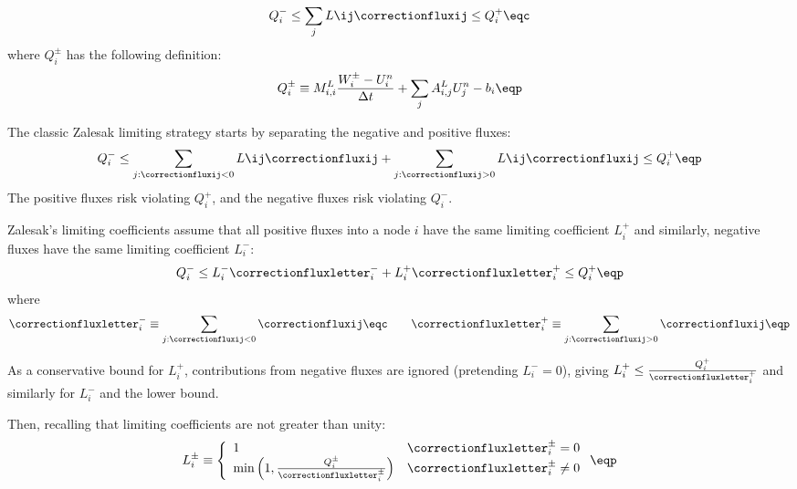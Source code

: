       \begin{equation}
         Q^-_i \leq \sum\limits_j L\ij \correctionfluxij \leq Q^+_i \eqc
      \end{equation}
      where $Q_i^\pm$ has the following definition:
      \begin{equation}
         Q_i^\pm \equiv M_{i,i}^L\frac{W_i^\pm-U_i^n}{\Delta t}
         + \sum\limits_j A_{i,j}^L U_j^n - b_i \eqp
      \end{equation}
   \item The classic Zalesak limiting strategy starts by separating the
      negative and positive fluxes:
      \begin{equation}
         Q^-_i \leq \sum\limits_{j:\correctionfluxij<0} L\ij \correctionfluxij +
            \sum\limits_{j:\correctionfluxij>0} L\ij \correctionfluxij\leq Q^+_i \eqp
      \end{equation}
      The positive fluxes risk violating $Q_i^+$, and the negative fluxes risk
      violating $Q_i^-$.
   \item Zalesak's limiting coefficients assume that
      all positive fluxes into a node $i$ have the same limiting coefficient
      $L^+_i$ and similarly, negative fluxes have the same limiting coefficient
      $L^-_i$:
      \begin{equation}
        Q^-_i \leq L^-_i \correctionfluxletter^-_i
          + L^+_i \correctionfluxletter^+_i \leq Q^+_i \eqp
      \end{equation}
      where
      \begin{equation}
        \correctionfluxletter_i^- \equiv \sum\limits_{j:\correctionfluxij<0}
          \correctionfluxij \eqc \qquad
        \correctionfluxletter_i^+ \equiv \sum\limits_{j:\correctionfluxij>0}
          \correctionfluxij \eqp
      \end{equation}
   \item As a conservative bound for $L^+_i$, contributions from negative fluxes
      are ignored (pretending $L_i^-=0$), giving
      $L^+_i \leq \frac{Q_i^+}{\correctionfluxletter_i^+}$
      and similarly for $L^-_i$ and the lower bound.
   \item Then, recalling that limiting coefficients are not greater than unity:
      \begin{equation}
         L_i^\pm \equiv\left\{
            \begin{array}{l l}
               1 & \correctionfluxletter_i^\pm = 0\\
               \min\left(1,\frac{Q_i^\pm}{\correctionfluxletter_i^\pm}\right) &
                 \correctionfluxletter_i^\pm \ne 0
            \end{array}
            \right. \eqp
      \end{equation}
